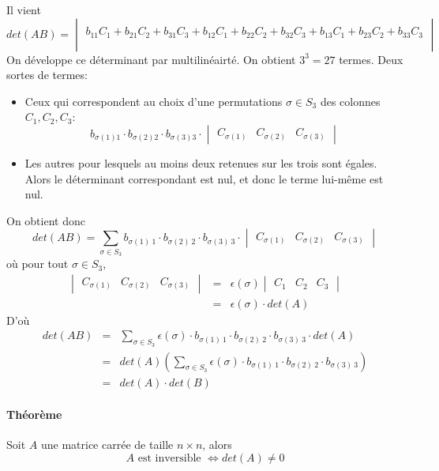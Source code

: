 Il vient
$$det(A B) = \begin{vmatrix} \\ b_{11} C_1 + b_{21} C_2 + b_{31} C_3 + b_{12} C_1 + b_{22} C_2 + b_{32} C_3 + b_{13} C_1 + b_{23} C_2 + b_{33} C_3 \\ \\ \end{vmatrix}$$
On développe ce déterminant par multilinéairté. On obtient $3^3 = 27$ termes. Deux sortes de termes:
\begin{itemize}
  \item Ceux qui correspondent au choix d'une permutations $\sigma \in S_3$ des colonnes $C_1, C_2, C_3$:
    $$b_{\sigma(1) 1} \cdot b_{\sigma(2) 2} \cdot b_{\sigma(3) 3} \cdot \begin{vmatrix} C_{\sigma(1)} & C_{\sigma(2)} & C_{\sigma(3)} \end{vmatrix}$$
    
  \item Les autres pour lesquels au moins deux retenues sur les trois sont égales. Alors le déterminant correspondant est nul, et donc le terme lui-même est nul.
\end{itemize}
On obtient donc
$$det(A B) = \sum_{\sigma \in S_3} b_{\sigma(1) ~ 1} \cdot b_{\sigma(2) ~ 2} \cdot b_{\sigma(3) ~ 3} \cdot \begin{vmatrix} C_{\sigma(1)} & C_{\sigma(2)} & C_{\sigma(3)} \end{vmatrix}$$
où pour tout $\sigma \in S_3$,
\begin{eqnarray*}
  \begin{vmatrix} C_{\sigma(1)} & C_{\sigma(2)} & C_{\sigma(3)} \end{vmatrix}
  &=& \epsilon(\sigma) \begin{vmatrix} C_1 & C_2 & C_ 3 \end{vmatrix} \\
    &=& \epsilon(\sigma) \cdot det(A)
\end{eqnarray*}
D'où
\begin{eqnarray*}
  det(A B) &=& \sum_{\sigma \in S_3} \epsilon(\sigma) \cdot b_{\sigma(1) ~ 1} \cdot b_{\sigma(2) ~ 2} \cdot b_{\sigma(3) ~ 3} \cdot det(A) \\
    &=& det(A) \left( \sum_{\sigma \in S_3} \epsilon(\sigma) \cdot b_{\sigma(1) ~ 1} \cdot b_{\sigma(2) ~ 2} \cdot b_{\sigma(3) ~ 3} \right) \\
    &=& det(A) \cdot det(B)
\end{eqnarray*}

\paragraph{Théorème} Soit $A$ une matrice carrée de taille $n \times n$, alors 
$$A \text{ est inversible } \Leftrightarrow det(A) \neq 0$$

